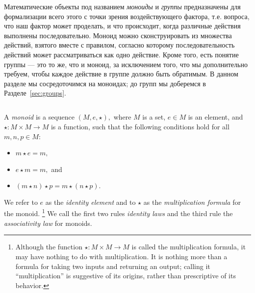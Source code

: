 \documentclass[../main/CT4S-EN-RU]{subfiles}
\begin{document}
\begin{blockRUS}
Математические объекты под названием {\em моноиды} и {\em группы} предназначены для формализации всего этого с точки зрения воздействующего фактора, т.е. вопроса, что наш фактор может проделать, и что происходит, когда различные действия выполнены последовательно. Моноид можно сконструировать из множества действий, взятого вместе с правилом, согласно которому последовательность действий может рассматриваться как одно действие. Кроме того, есть понятие группы — это то же, что и моноид, за исключением того, что мы дополнительно требуем, чтобы каждое действие в группе должно быть обратимым. В данном разделе мы сосредоточимся на моноидах; до групп мы доберемся в Разделе~\ref{sec:groups}.
\end{blockRUS}


\subsection{}

\begin{definitionENG}[Monoid]\label{def:monoid}
A {\em monoid} is a sequence $(M,e,{⋆}),$ where $M$ is a set, $e\in M$ is an element, and ${⋆}\colon M\times M{→} M$ is a function, such that the following conditions hold for all $m,n,p\in M$:
\begin{itemize}
\item $m{⋆} e=m,$
\item $e{⋆} m=m,$ and
\item $(m{⋆} n){⋆} p=m{⋆}(n{⋆} p).$
\end{itemize}
We refer to $e$ as the {\em identity element} and to ${⋆}$ as the {\em multiplication formula} for the monoid.%
\footnote{Although the function ${⋆}\colon M\times M{→} M$ is called the multiplication formula, it may have nothing to do with multiplication. It is nothing more than a formula for taking two inputs and returning an output; calling it “multiplication” is suggestive of its origins, rather than prescriptive of its behavior.}
We call the first two rules {\em identity laws} and the third rule the {\em associativity law} for monoids.
\end{definitionENG}
\end{document}
